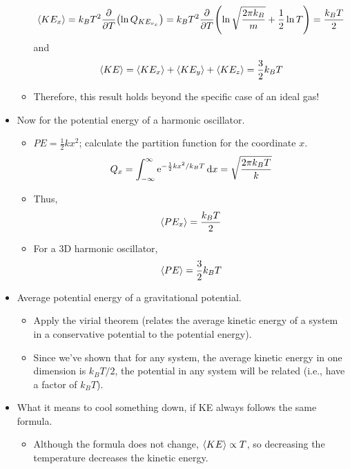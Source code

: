 \documentclass[../notes.tex]{subfiles}
\begin{document}
\begin{itemize}
\begin{itemize}
\begin{equation*}
            \prb{KE_x} = k_BT^2\pdv{T}(\ln Q_{KE_{v_x}})
            = k_BT^2\pdv{T}(\ln\sqrt{\frac{2\pi k_B}{m}}+\frac{1}{2}\ln T)
            = \frac{k_BT}{2}
        \end{equation*}
        and
        \begin{equation*}
            \prb{KE} = \prb{KE_x}+\prb{KE_y}+\prb{KE_z}
            = \frac{3}{2}k_BT
        \end{equation*}
        \item Therefore, this result holds beyond the specific case of an ideal gas!
    \end{itemize}
    \item Now for the potential energy of a harmonic oscillator.
    \begin{itemize}
        \item $PE=\frac{1}{2}kx^2$; calculate the partition function for the coordinate $x$.
        \begin{equation*}
            Q_x = \int_{-\infty}^\infty\e[-\frac{1}{2}kx^2/k_BT]\dd{x}
            = \sqrt{\frac{2\pi k_BT}{k}}
        \end{equation*}
        \item Thus,
        \begin{equation*}
            \prb{PE_x} = \frac{k_BT}{2}
        \end{equation*}
        \item For a 3D harmonic oscillator,
        \begin{equation*}
            \prb{PE} = \frac{3}{2}k_BT
        \end{equation*}
    \end{itemize}
    \item Average potential energy of a gravitational potential.
    \begin{itemize}
        \item Apply the virial theorem (relates the average kinetic energy of a system in a conservative potential to the potential energy).
        \item Since we've shown that for any system, the average kinetic energy in one dimension is $k_BT/2$, the potential in any system will be related (i.e., have a factor of $k_BT$).
    \end{itemize}
    \item What it means to cool something down, if KE always follows the same formula.
    \begin{itemize}
        \item Although the formula does not change, $\prb{KE}\propto T$, so decreasing the temperature decreases the kinetic energy.

\end{itemize}
\end{itemize}
\end{document}
